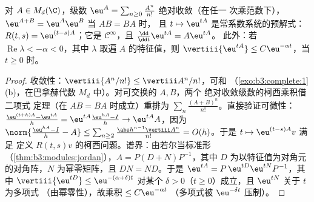 \begin{theorem}[矩阵指数]\label{thm:b3:ode:matrixexp}
对 $A \in M_d(\C)$，级数 $\eu^{A} =
\sum_{n\geq0}\frac{A^n}{n!}$ 绝对收敛（在任一
次乘范数下），$\eu^{A+B} = \eu^A\eu^B$ 当 $AB = BA$ 时，
且 $t \mapsto \eu^{tA}$ 是常系数系统的预解式：
$R(t,s) = \eu^{(t-s)A}$；它是 $\mathcal
C^\infty$，且 $\frac{\dd}{\dd t}\eu^{tA} = A\eu^{tA}$。
此外：若 $\operatorname{Re}\lambda < -\alpha < 0$，其中 $\lambda$ 取遍
$A$ 的特征值，则 $\vertiii{\eu^{tA}}
\leq C\eu^{-\alpha t}$，当 $t \geq 0$ 时。
\end{theorem}

\begin{proof}
收敛性：$\vertiii{A^n/n!} \leq \vertiii A^n/n!$，可和
（\cref{exo:b3:complete:1}(b)，在巴拿赫代数
$M_d$ 中）。对可交换的 $A, B$，两个
绝对收敛级数的柯西乘积借二项式
定理（在 $AB = BA$ 时成立）重排为
$\sum_n\frac{(A+B)^n}{n!}$。直接验证可微性：
$\frac{\eu^{(t+h)A} - \eu^{tA}}h = \eu^{tA}\frac{\eu^{hA} -
I}{h} \to \eu^{tA}A$，因为 $\norm{\frac{\eu^{hA} - I}h - A}
\leq \sum_{n\geq2}\frac{\abs h^{n-1}\vertiii A^n}{n!} =
O(h)$。于是 $t \mapsto \eu^{(t - s)A}v$ 满足
定义 $R(t,s)v$ 的柯西问题。谱界：由若尔当标准形
（\cref{thm:b3:modules:jordan}），$A = P(D + N)P^{-1}$，其中 $D$
为以特征值为对角元的对角阵，$N$ 为幂零矩阵，且 $DN =
ND$。于是 $\eu^{tA} = P\,\eu^{tD}\eu^{tN}P^{-1}$，其中
$\vertiii{\eu^{tD}} \leq \eu^{-(\alpha + \delta)t}$ 对某个
$\delta > 0$（$t \geq 0$）成立，且 $\eu^{tN}$ 关于 $t$ 为多项式
（由幂零性），故乘积 $\leq C\eu^{-\alpha t}$
（多项式被 $\eu^{-\delta t}$ 压制）。
\end{proof}

